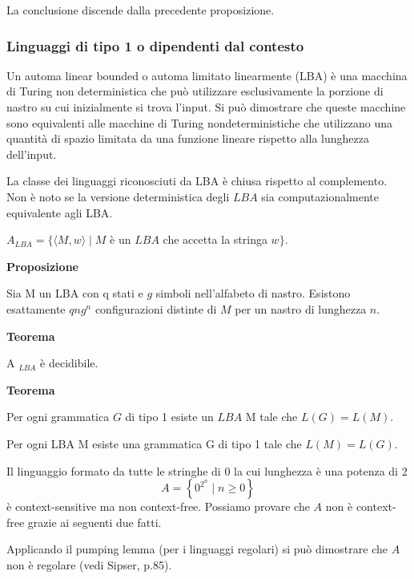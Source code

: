 La conclusione discende dalla precedente proposizione.

\subsubsection{Linguaggi di tipo 1 o dipendenti dal contesto}

Un automa linear bounded o automa limitato linearmente (LBA) è una macchina di Turing non deterministica che può utilizzare esclusivamente la porzione di nastro su cui inizialmente si trova l'input.
Si può dimostrare che queste macchine sono equivalenti alle macchine di Turing nondeterministiche che utilizzano una quantità di spazio limitata da una funzione lineare rispetto alla lunghezza dell'input.

La classe dei linguaggi riconosciuti da LBA è chiusa rispetto al complemento.
Non è noto se la versione deterministica degli $L B A$ sia computazionalmente equivalente agli LBA.

\vspace{5mm}

$A_{L B A}=\{\langle M, w\rangle \mid M$ è un $L B A$ che accetta la stringa $w\} .$

\vspace{5mm}

\textbf{Proposizione}

Sia M un LBA con q stati e $g$ simboli nell'alfabeto di nastro.
Esistono esattamente $q n g^{n}$ configurazioni distinte di $M$ per un nastro di lunghezza $n .$

\vspace{5mm}

\textbf{Teorema}

A $_{L B A}$ è decidibile.

\vspace{5mm}

\textbf{Teorema}

Per ogni grammatica $G$ di tipo 1 esiste un $L B A$ M tale che $L(G)=L(M) .$

Per ogni LBA M esiste una grammatica G di tipo 1 tale che $L(M)=L(G) .$

\vspace{5mm}

Il linguaggio formato da tutte le stringhe di 0 la cui lunghezza è una potenza di 2
$$
A=\left\{0^{2^{n}} \mid n \geq 0\right\}
$$
è context-sensitive ma non context-free.
Possiamo provare che $A$ non è context-free grazie ai seguenti due fatti.

Applicando il pumping lemma (per i linguaggi regolari) si può dimostrare che $A$ non è regolare (vedi Sipser, p.85).

